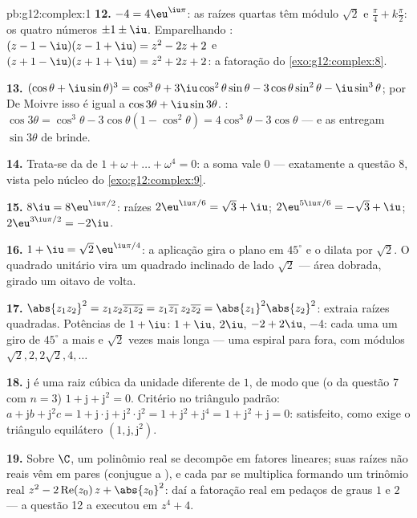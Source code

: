 \begin{solution}{pb:g12:complex:1}
\textbf{12.} $-4 = 4\eu^{\iu\pi}$: as raízes quartas têm módulo
$\sqrt2$ e  $\frac{\pi}{4} + k\frac{\pi}{2}$: os
quatro números $\pm 1 \pm \iu$. Emparelhando :
$(z - 1 - \iu)(z - 1 + \iu) = z^2 - 2z + 2$ e
$(z + 1 - \iu)(z + 1 + \iu) = z^2 + 2z + 2$: a fatoração do
\cref{exo:g12:complex:8}.

\textbf{13.} $(\cos\theta + \iu\sin\theta)^3 = \cos^3\theta +
3\iu\cos^2\theta\sin\theta - 3\cos\theta\sin^2\theta -
\iu\sin^3\theta$; por De Moivre isso é igual a
$\cos 3\theta + \iu \sin 3\theta$. :
$\cos 3\theta = \cos^3\theta - 3\cos\theta(1 - \cos^2\theta)
= 4\cos^3\theta - 3\cos\theta$ --- e as 
entregam $\sin 3\theta$ de brinde.

\textbf{14.} Trata-se da  de
$1 + \omega + \dots + \omega^4 = 0$: a soma vale $0$ ---
exatamente a questão 8, vista pelo núcleo do
\cref{exo:g12:complex:9}.

\textbf{15.} $8\iu = 8\eu^{\iu\pi/2}$: raízes
$2\eu^{\iu\pi/6} = \sqrt3 + \iu$;
$2\eu^{5\iu\pi/6} = -\sqrt3 + \iu$;
$2\eu^{3\iu\pi/2} = -2\iu$.

\textbf{16.} $1 + \iu = \sqrt2\,\eu^{\iu\pi/4}$: a aplicação
gira o plano em $45^\circ$ e o dilata por $\sqrt2$. O quadrado
unitário vira um quadrado inclinado de lado $\sqrt2$ --- área
dobrada, girado um oitavo de volta.

\textbf{17.} $\abs{z_1 z_2}^2 = z_1 z_2 \overline{z_1 z_2} =
z_1\overline{z_1}\, z_2\overline{z_2} =
\abs{z_1}^2\abs{z_2}^2$: extraia raízes quadradas. Potências de
$1 + \iu$: $1 + \iu$, $2\iu$, $-2 + 2\iu$, $-4$: cada uma um
giro de $45^\circ$ a mais e $\sqrt2$ vezes mais longa --- uma
espiral para fora, com módulos
$\sqrt2, 2, 2\sqrt2, 4, \dots$

\textbf{18.} $\mathrm{j}$ é uma raiz cúbica da unidade
diferente de $1$, de modo que (o  da questão 7 com
$n = 3$) $1 + \mathrm{j} + \mathrm{j}^2 = 0$. Critério no
triângulo padrão: $a + \mathrm{j}b + \mathrm{j}^2 c = 1 +
\mathrm{j}\cdot\mathrm{j} + \mathrm{j}^2 \cdot \mathrm{j}^2 =
1 + \mathrm{j}^2 + \mathrm{j}^4 = 1 + \mathrm{j}^2 +
\mathrm{j} = 0$: satisfeito, como exige o triângulo equilátero
$\left(1, \mathrm{j}, \mathrm{j}^2\right)$.

\textbf{19.} Sobre $\C$, um polinômio real se decompõe em
fatores lineares; suas raízes não reais vêm em pares 
(conjugue a ), e cada par se multiplica formando um
trinômio real
$z^2 - 2\operatorname{Re}(z_0)\,z + \abs{z_0}^2$: daí a
fatoração real em pedaços de graus $1$ e $2$ --- a questão 12 a
executou em $z^4 + 4$.


\end{solution}
